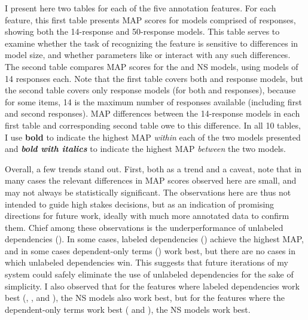 I present here two tables for each of the five annotation features. For each feature, this first table presents MAP scores for models comprised of  responses, showing both the 14-response and 50-response models. This table serves to examine whether the task of recognizing the feature is sensitive to differences in model size, and whether parameters like  or  interact with any such differences. The second table compares MAP scores for the  and  NS models, using models of 14 responses each. Note that the first table covers both  and  response models, but the second table covers only  response models (for both  and  responses), because for some items, 14 is the maximum number of  responses available (including first and second responses). MAP differences between the  14-response models in each first table and corresponding second table owe to this difference. In all 10 tables, I use \textbf{bold} to indicate the highest  MAP \textit{within} each of the two models presented and \textit{\textbf{bold with italics}} to indicate the highest MAP \textit{between} the two models.

Overall, a few trends stand out. First, both as a trend and a caveat, note that in many cases the relevant differences in MAP scores observed here are small, and may not always be statistically significant.
The observations here are thus not intended to guide high stakes decisions, but as an indication of promising directions for future work, ideally with much more annotated data to confirm them.  Chief among these observations is the underperformance of unlabeled dependencies (). In some cases, labeled dependencies () achieve the highest MAP, and in some cases dependent-only terms () work best, but there are no cases in which unlabeled dependencies win. This suggests that future iterations of my system could safely eliminate the use of unlabeled dependencies for the sake of simplicity. I also observed that for the features where labeled dependencies work best (, , and ), the  NS models also work best, but for the features where the dependent-only terms work best ( and ), the  NS models work best.

